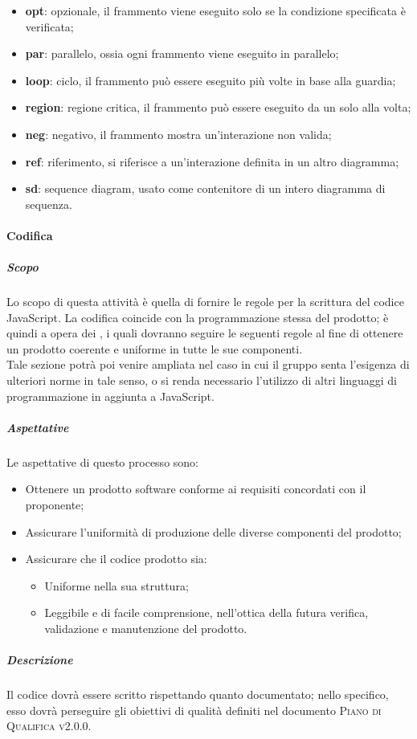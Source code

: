 \documentclass[../norme-di-progetto.tex]{subfiles}
\begin{document}
\begin{itemize}
\begin{itemize}
\begin{itemize}
      \item \textbf{opt}: opzionale, il frammento viene eseguito solo se la condizione specificata è verificata;
      \item \textbf{par}: parallelo, ossia ogni frammento viene eseguito in parallelo;
      \item \textbf{loop}: ciclo, il frammento può essere eseguito più volte in base alla guardia;
      \item \textbf{region}: regione critica, il frammento può essere eseguito da un solo  alla volta;
      \item \textbf{neg}: negativo, il frammento mostra un'interazione non valida;
      \item \textbf{ref}: riferimento, si riferisce a un'interazione definita in un altro diagramma;
      \item \textbf{sd}: sequence diagram, usato come contenitore di un intero diagramma di sequenza.
    \end{itemize}
  \end{itemize}
\end{itemize}

\paragraph{Codifica}
\subparagraph{Scopo}
Lo scopo di questa attività è quella di fornire le regole per la scrittura del codice JavaScript. La codifica coincide con la programmazione stessa del prodotto; è quindi a opera dei , i quali dovranno seguire le seguenti regole al fine di ottenere un prodotto coerente e uniforme in tutte le sue componenti. \\
Tale sezione potrà poi venire ampliata nel caso in cui il gruppo senta l'esigenza di ulteriori norme in tale senso, o si renda necessario l'utilizzo di altri linguaggi di programmazione in aggiunta a JavaScript.
\subparagraph{Aspettative}
Le aspettative di questo processo sono:
\begin{itemize}
  \item Ottenere un prodotto software conforme ai requisiti concordati con il proponente;
  \item Assicurare l'uniformità di produzione delle diverse componenti del prodotto;
  \item Assicurare che il codice prodotto sia:
  \begin{itemize}
    \item Uniforme nella sua struttura;
    \item Leggibile e di facile comprensione, nell'ottica della futura verifica, validazione e manutenzione del prodotto.
  \end{itemize}
\end{itemize}
\subparagraph{Descrizione}
Il codice dovrà essere scritto rispettando quanto documentato; nello specifico, esso dovrà perseguire gli obiettivi di qualità definiti nel documento \textsc{Piano di Qualifica v2.0.0}.
\end{document}
